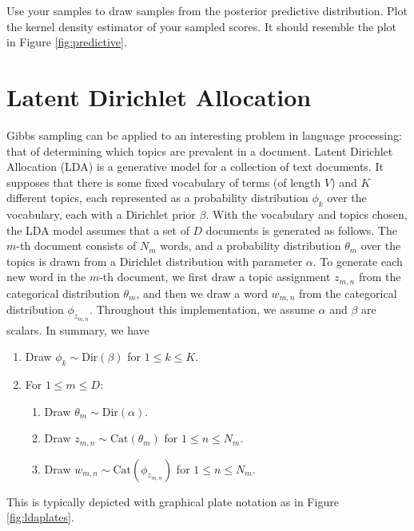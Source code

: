 \begin{problem}
Use your samples to draw samples from the posterior predictive distribution. Plot the kernel density estimator of your sampled scores.
It should resemble the plot in Figure \ref{fig:predictive}.
\end{problem}

\section*{Latent Dirichlet Allocation}
Gibbs sampling can be applied to an interesting problem in language processing: that of determining which topics are prevalent in a document.
Latent Dirichlet Allocation (LDA) is a generative model for a collection of text documents.
It supposes that there is some fixed vocabulary of terms (of length $V$) and $K$ different topics, each represented as a probability distribution $\phi_{k}$ over the vocabulary, each with a Dirichlet prior $\beta$.
With the vocabulary and topics chosen, the LDA model assumes that a set of $D$ documents is generated as follows.
The $m$-th document consists of $N_m$ words, and
a probability distribution $\theta_{m}$ over the topics is drawn from a Dirichlet distribution with parameter $\alpha$.
To generate each new word in the $m$-th document, we first draw a topic assignment $z_{m,n}$ from the categorical distribution $\theta_{m}$, and then we draw a word $w_{m,n}$ from the categorical distribution $\phi_{z_{m,n}}$. Throughout this implementation, we assume $\alpha$ and $\beta$ are scalars. In summary, we have
\begin{enumerate}
	\item Draw $\phi_{k} \sim \text{Dir}(\beta)$ for $1 \leq k \leq K$.
	\item For $1 \leq m \leq D$:
	\begin{enumerate}
        \item Draw $\theta_{m} \sim \text{Dir}(\alpha)$.
        \item Draw $z_{m,n} \sim \text{Cat}(\theta_{m})$ for $1 \leq n \leq N_{m}$.
	    \item Draw $w_{m,n} \sim \text{Cat}(\phi_{z_{m,n}})$ for $1 \leq n \leq N_{m}$.
	\end{enumerate}
\end{enumerate}
This is typically depicted with graphical plate notation as in Figure \ref{fig:ldaplates}.
